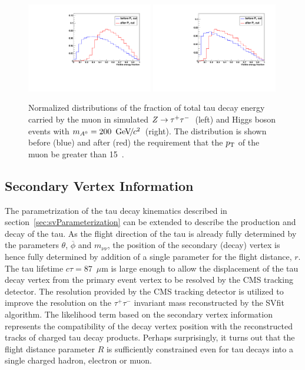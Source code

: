\begin{figure}[t]
\begin{center}
\includegraphics*[width=0.49\textwidth]{svfit_chapter/figures/scuplting_Ztautau_powheg_muon.pdf}
\includegraphics*[width=0.49\textwidth]{svfit_chapter/figures/scuplting_A200_muon.pdf}
\caption[Effect of the visible \pt requirements for $Z$ and Higgs
boson events]{\captiontext Normalized distributions of the fraction of total tau decay
energy carried by the muon in simulated $Z\to\tau^+\tau^-$~(left) and Higgs boson events with
\mbox{$m_{A^0} = 200~{\,\text{Ge\hspace{-.08em}V\hspace{-0.16em}/\hspace{-0.08em}}c^\text{2}}$}~(right).   The distribution is shown before (blue) and
after (red) the requirement that the $p_{\mathrm{T}}$ of the muon be greater than
15~\GeVc.} \label{fig:ptBalancePtVisCutsCompareMasses}
\end{center}
\end{figure} 

\subsection{Secondary Vertex Information} 

The parametrization of the tau decay kinematics described in
section~\ref{sec:svParameterization} can be extended to describe the production
and decay of the tau.  As the flight direction of the tau is already fully
determined by the parameters $\theta$, $\overline{\phi}$ and $m_{\nu\nu}$, the
position of the secondary (decay) vertex is hence fully determined by addition
of a single parameter for the flight distance, $r$.  The tau lifetime $c\tau =
87$~$\mu$m is large enough to allow the displacement of the tau decay vertex
from the primary event vertex to be resolved by the CMS tracking detector.  The
resolution provided by the CMS tracking detector is utilized to improve the
resolution on the $\tau^{+} \tau^{-}$ invariant mass reconstructed by the SVfit
algorithm.  The likelihood term based on the secondary vertex information
represents the compatibility of the decay vertex position with the reconstructed
tracks of charged tau decay products.  Perhaps surprisingly, it turns out that
the flight distance parameter $R$ is sufficiently constrained even for tau
decays into a single charged hadron, electron or muon.

